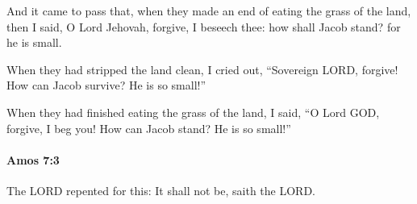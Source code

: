 			\begin{versebox}
					\item[BHS] 
					\item[LXX] 
					\item[ASV] And it came to pass that, when they made an end of eating the grass of the land, then I said, O Lord Jehovah, forgive, I beseech thee: how shall Jacob stand? for he is small.
					\item[NIV] When they had stripped the land clean, I cried out, “Sovereign LORD, forgive! How can Jacob survive? He is so small!”
					\item[NRSV] When they had finished eating the grass of the land, I said, “O Lord GOD, forgive, I beg you! How can Jacob stand? He is so small!”
			\end{versebox}

		\paragraph{Amos 7:3} %
			\label{AMOS-7-3}

			The LORD repented for this: It shall not be, saith the LORD.

